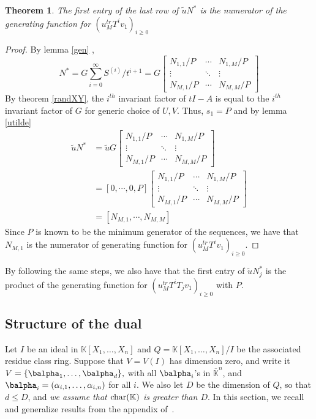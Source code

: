 \documentclass[12pt]{article}
\def\K {\ensuremath{\mathbb{K}}}
\def\Kbar {{\ensuremath{\overline{\mathbb{K}}}}}
\def\D {\ensuremath{D}}
\newtheorem{theorem}[definition]{Theorem}
\def\K{\mathbb{K}}
\begin{document}
\begin{theorem}
	 The first entry of the last row of $\tilde{u} N^*$ is  
	 the numerator of the generating function for 
	 $(u_{M}^{tr} T^i v_{1})_{i \ge 0}$
\end{theorem}

\begin{proof}
	By lemma \ref{gen} , 
	$$ N^* = G \sum_{i=0}^{\infty} S^{(i)}/t^{i+1} = G 
	\begin{bmatrix}
	N_{1,1} / P & \cdots & N_{1,M} / P \\
	\vdots      & \ddots & \vdots \\
	N_{M,1} / P & \cdots & N_{M,M} / P
	\end{bmatrix}
	$$
	By theorem \ref{randXY}, the $i^{th}$ invariant factor of
	$tI - A$ is equal to the $i^{th}$ invariant factor of $G$ for generic choice of
	$U,V$. Thus, $s_1 = P$ and by lemma \ref{utilde}
	\begin{align*}
	\tilde{u} N^* &= \tilde{u} G
	\begin{bmatrix}
	N_{1,1} / P & \cdots & N_{1,M} / P \\
	\vdots            & \ddots & \vdots \\
	N_{M,1} / P & \cdots & N_{M,M} / P
	\end{bmatrix} \\
	&= [0,\cdots,0,P]
	\begin{bmatrix}
	N_{1,1} / P & \cdots & N_{1,M} / P \\
	\vdots            & \ddots & \vdots \\
	N_{M,1} / P & \cdots & N_{M,M} / P
	\end{bmatrix}\\
	&= [N_{M,1} , \cdots , N_{M,M}]
	\end{align*}
	Since $P$ is known to be the minimum generator of 
	the sequences, we have that $N_{M,1}$ is the
	numerator of generating function for 
	$(u_{M}^{tr} T^i v_{1})_{i \ge 0}$.
\end{proof}

By following the same steps, we also have that the first
entry of $\tilde{u} N^*_j$ is the product of the 
generating function for $(u^{tr}_M T^i T_j v_1)_{i \ge 0}$ with
$P$.

\subsection{Structure of the dual}
\label{dual}
Let $I$ be an ideal in
$\K[X_1,\dots,X_n]$ and $Q=\K[X_1,\dots,X_n]/I$ be the associated
residue class ring. Suppose that $V=V(I)$ has dimension zero, and
write it $V=\{\balpha_1,\dots,\balpha_d\},$ with all $\balpha_i$'s in
$\Kbar^n$, and $\balpha_i=(\alpha_{i,1},\dots,\alpha_{i,n})$ for all
$i$.  We also let $\D$ be the dimension of $Q$, so that $d \le \D$,
and {\em we assume that ${\rm char}(\K)$ is greater than $D$}. In this
section, we recall and generalize results from the appendix
of~\cite{BoSaSc03}.
\end{document}
